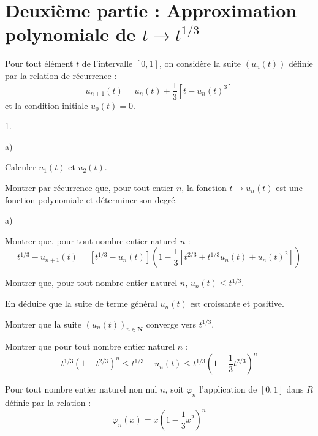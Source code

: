 \documentclass[11pt]{article}%
\begin{document}
\section*{Deuxième partie : Approximation polynomiale de $t\rightarrow
t^{1/3}$}

Pour tout élément $t$ de l'intervalle $[0,1]$, on considère la suite
$(u_{n}(t))$ définie par la relation de récurrence : 
\[
u_{n + 1}(t) = u_{n}(t) + \frac 13 \left[ t-u_{n}(t)^{3}\right]
\]
et la condition initiale $u_{0}(t) = 0$.

\begin{noliste}{1.}
 \setlength{\itemsep}{4mm}
\item 

\begin{noliste}{a)}
 \setlength{\itemsep}{2mm}
\item Calculer $u_{1}(t)$ et $u_{2}(t)$. 

\item Montrer par récurrence que, pour tout entier $n$, la fonction
$t\rightarrow u_{n}(t)$ est une fonction polynomiale et déterminer son
degré. 
\end{noliste}

\item 

\begin{noliste}{a)}
 \setlength{\itemsep}{2mm}
\item Montrer que, pour tout nombre entier naturel $n$ : 
\[
t^{1/3}-u_{n + 1}(t) = \left[ t^{1/3}-u_{n}(t)\right] \left(
1-\frac{1}{3}\left[
t^{2/3} + t^{1/3}u_{n}(t) + u_{n}(t)^{2}\right] \right) 
\]

\item Montrer que, pour tout nombre entier naturel $n$, $u_{n}(t)\leq
t^{1/3}$. 

\item En déduire que la suite de terme général $u_{n}(t)$ est
croissante et
positive. 

\item Montrer que la suite $(u_{n}(t))_{n\in \mathbf{N}}$ converge vers
$t^{1/3}$. 
\end{noliste}

\item Montrer que pour tout nombre entier naturel $n$ : 
\[
t^{1/3}\left( 1-t^{2/3}\right) ^{n}\leq t^{1/3}-u_{n}(t)\leq
t^{1/3}\left( 1-\frac{1}{3}t^{2/3}\right) ^{n}
\]

\item Pour tout nombre entier naturel non nul $n$, soit $\varphi_{n}$
l'application de $[0,1]$ dans $R$ définie par la relation : 
\[
\varphi_{n}(x) = x\left( 1-\frac{1}{3}x^{2}\right) ^{n}
\]


\end{noliste}
\end{document}
